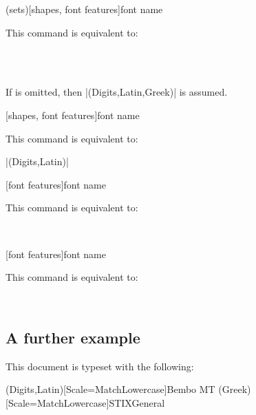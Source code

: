 \documentclass{ltxdockit}
\begin{document}
\begin{ltxsyntax}

(sets)[shapes, font features]{font name}

This command is equivalent to:

\\
\\

If  is omitted, then |(Digits,Latin,Greek)| is assumed.

[shapes, font features]{font name}

This command is equivalent to:

|(Digits,Latin)|

[font features]{font name}

This command is equivalent to:

\\

[font features]{font name}

This command is equivalent to:

\\

\end{ltxsyntax}

\subsection{A further example}

This document is typeset with the following:

\begin{example}
\setmainfont[Numbers=OldStyle]{Sabon LT Std}
\setmathsfont(Digits,Latin)[Scale=MatchLowercase]{Bembo MT}
\setmathsfont(Greek)[Scale=MatchLowercase]{STIXGeneral}
\setminwhitespace[750]
\end{example}
\end{document}
